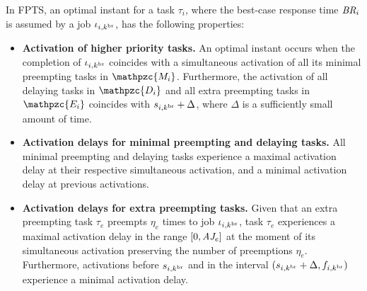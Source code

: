 \begin{theorem} \label{thm:optimal_instant_fpts}
	In FPTS, an optimal instant for a task $\tau_i$, where the best-case response time $\mbox{\it BR}_i$ is assumed by a job $\iota_{i,k^{\rm{br}}}$, has the following properties:
	\begin{itemize}
		\item \textbf{Activation of higher priority tasks.}
		An optimal instant occurs when the completion of $\iota_{i,k^{\rm{br}}}$ coincides with a simultaneous activation of all its {minimal preempting} tasks in $\mathpzc{M_i}$. Furthermore, the activation of all delaying tasks in $\mathpzc{D_i}$ and all {extra preempting} tasks in $\mathpzc{E_i}$ coincides with $s_{i,k^{\rm{br}}}+\Delta$, where $\Delta$ is a sufficiently small amount of time. 
		
		\item \textbf{Activation delays for minimal preempting and delaying tasks.}
		All minimal	preempting and delaying tasks experience a maximal activation delay at their respective simultaneous activation, and a minimal activation delay at previous activations.
		
		\item \textbf{Activation delays for extra preempting tasks.}
		Given that an extra preempting task $\tau_e$ preempts $\eta_e$ times to job $\iota_{i,k^{\rm{br}}}$, task $\tau_e$ experiences a maximal activation delay in the range $[0,\mbox{\it AJ}_e]$ at the moment of its simultaneous activation preserving the number of preemptions $\eta_e$. Furthermore, activations before $s_{i,k^{\rm{br}}}$ and in the interval $(s_{i,k^{\rm{br}}}+\Delta, f_{i,k^{\rm{br}}})$ experience a minimal activation delay.
	\end{itemize}

\end{theorem}



